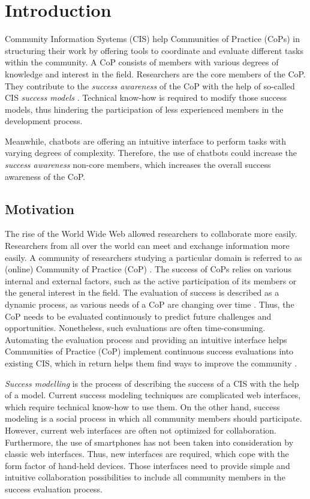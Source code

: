 \chapter{Introduction}
Community Information Systems (CIS) help Communities of Practice (CoPs) in structuring their work by offering tools to coordinate and evaluate different tasks within the community.
A CoP consists of members with various degrees of knowledge and interest in the field.
Researchers are the core members of the CoP.
They contribute to the \emph{success awareness} of the CoP with the help of so-called CIS \emph{success models} \cite{Klam10c}.
Technical know-how is required to modify those success models, thus hindering the participation of less experienced members
in the development process.

Meanwhile, chatbots are offering an intuitive interface to perform tasks with varying degrees of complexity. 
Therefore, the use of chatbots could increase the \emph{success awareness} non-core members, which increases the overall success awareness of the CoP.

\section{Motivation}
The rise of the World Wide Web allowed researchers to collaborate more easily. Researchers from all over the world can meet and exchange information more easily. A community of researchers studying a particular domain is referred to as (online) Community of Practice (CoP) \cite{Renz08}.
The success of CoPs relies on various internal and external factors, such as the active participation of its members or the general interest in the field.
The evaluation of success is described as a dynamic process, as various needs of a CoP are changing over time \cite{Renz08,GKJa08}.
Thus, the CoP needs to be evaluated continuously to predict future challenges and opportunities.
Nonetheless, such evaluations are often time-consuming. Automating the evaluation process and providing an intuitive interface helps Communities of Practice (CoP) implement continuous success evaluations into existing CIS, which in return helps them find ways to improve the community \cite{Renz08}.

\emph{Success modelling} is the process of describing the success of a CIS with the help of a model. 
Current success modeling techniques are complicated web interfaces, which require technical know-how to use them.
On the other hand, success modeling is a social process in which all community members should participate. However, current web interfaces are often not optimized for collaboration.
Furthermore, the use of smartphones has not been taken into consideration by classic web interfaces.
Thus, new interfaces are required, which cope with the form factor of hand-held devices. Those interfaces need to provide simple and intuitive collaboration possibilities to include all community members in the success evaluation process. 

